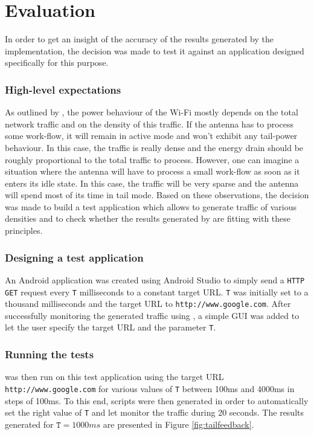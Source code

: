 \section{Evaluation}
\label{sec:eval}

In order to get an insight of the accuracy of the results generated by 
the implementation, the decision was made to test it against an 
application designed specifically for this purpose.

\subsubsection{High-level expectations}
\label{hw:eval:exp}

As outlined by \cite{pathak2012energy}, the power behaviour of the Wi-Fi 
mostly depends on the total network traffic and on the density of this 
traffic. If the antenna has to process some work-flow, it will remain in 
active mode and won't exhibit any tail-power behaviour. In this case, 
the traffic is really dense and the energy drain should be roughly 
proportional to the total traffic to process. However, one can imagine a 
situation where the antenna will have to process a small work-flow as 
soon as it enters its idle state. In this case, the traffic will be very 
sparse and the antenna will spend most of its time in tail mode. Based 
on these observations, the decision was made to build a test application 
which allows to generate traffic of various densities and to check 
whether the results generated by \Orka{} are fitting with these 
principles.

\subsubsection{Designing a test application}

An Android application was created using Android Studio to simply send a 
\texttt{HTTP GET} request every \texttt{T} milliseconds to a constant 
target URL. \texttt{T} was initially set to a thousand milliseconds and 
the target URL to \texttt{http://www.google.com}. After successfully 
monitoring the generated traffic using \Orka{}, a simple GUI was added 
to let the user specify the target URL and the parameter \texttt{T}.

\subsubsection{Running the tests}

\Orka{} was then run on this test application using the target URL 
\texttt{http://www.google.com} for various values of \texttt{T} between 
100ms and 4000ms in steps of 100ms. To this end, \monkeyrunner{} scripts 
were then generated in order to automatically set the right value of 
\texttt{T} and let \Orka{} monitor the traffic during 20 seconds. The 
results generated for $\texttt{T} = 1000ms$ are presented in Figure 
\ref{fig:tailfeedback}.


